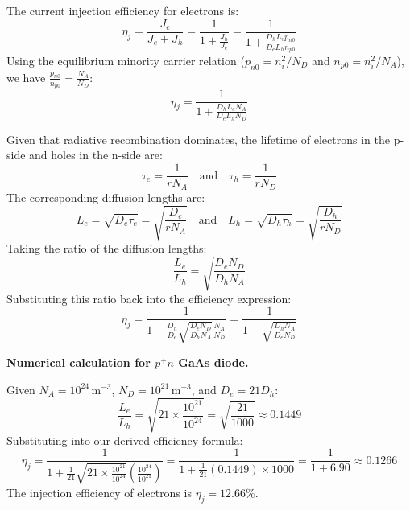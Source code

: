 The current injection efficiency for electrons is:
\begin{equation*}
  \eta_j = \frac{J_e}{J_e + J_h} = \frac{1}{1 + \frac{J_h}{J_e}} = \frac{1}{1 + \frac{D_h L_e p_{n0}}{D_e L_h n_{p0}}}
\end{equation*}
Using the equilibrium minority carrier relation ($p_{n0} = n_i^2/N_D$ and $n_{p0} = n_i^2/N_A$), we have $\frac{p_{n0}}{n_{p0}} = \frac{N_A}{N_D}$:
\begin{equation*}
  \eta_j = \frac{1}{1 + \frac{D_h L_e N_A}{D_e L_h N_D}}
\end{equation*}

Given that radiative recombination dominates, the lifetime of electrons in the p-side and holes in the n-side are:
\begin{equation*}
  \tau_e = \frac{1}{r N_A} \quad \text{and} \quad \tau_h = \frac{1}{r N_D}
\end{equation*}
The corresponding diffusion lengths are:
\begin{equation*}
  L_e = \sqrt{D_e \tau_e} = \sqrt{\frac{D_e}{r N_A}} \quad \text{and} \quad L_h = \sqrt{D_h \tau_h} = \sqrt{\frac{D_h}{r N_D}}
\end{equation*}
Taking the ratio of the diffusion lengths:
\begin{equation*}
  \frac{L_e}{L_h} = \sqrt{\frac{D_e N_D}{D_h N_A}}
\end{equation*}
Substituting this ratio back into the efficiency expression:
\begin{equation*}
  \eta_j = \frac{1}{1 + \frac{D_h}{D_e}\sqrt{\frac{D_e N_D}{D_h N_A}}\frac{N_A}{N_D}} = \boxed{\frac{1}{1 + \sqrt{\frac{D_h N_A}{D_e N_D}}}}
\end{equation*}

\textbf{Numerical calculation for $p^+n$ GaAs diode.}

Given $N_A = 10^{24}\,\text{m}^{-3}$, $N_D = 10^{21}\,\text{m}^{-3}$, and $D_e = 21 D_h$:
\begin{equation*}
  \frac{L_e}{L_h} = \sqrt{21 \times \frac{10^{21}}{10^{24}}} = \sqrt{\frac{21}{1000}} \approx 0.1449
\end{equation*}
Substituting into our derived efficiency formula:
\begin{equation*}
  \eta_j = \frac{1}{1 + \frac{1}{21}\sqrt{21 \times \frac{10^{21}}{10^{24}}}\left(\frac{10^{24}}{10^{21}}\right)} = \frac{1}{1 + \frac{1}{21}(0.1449)\times 1000} = \frac{1}{1 + 6.90} \approx 0.1266
\end{equation*}
The injection efficiency of electrons is $\eta_j = 12.66\%$.


